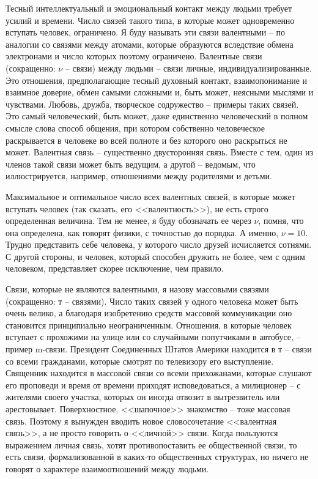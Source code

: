 \documentclass{book}
\begin{document}
Тесный интеллектуальный и эмоциональный контакт между людьми требует усилий и времени. Число связей такого типа, в которые может одновременно вступать человек, ограничено. Я буду называть эти связи валентными --  по аналогии со связями между атомами, которые образуются вследствие обмена электронами и число которых поэтому ограничено. Валентные связи (сокращенно: $\nu$ --  связи) между людьми -- связи личные, индивидуализированные. Это отношения, предполагающие тес­ный духовный контакт, взаимопонимание и взаимное доверие, обмен самыми сложными и, быть может, неясными мыслями и чувствами. Любовь, дружба, творческое содружество -- при­меры таких связей. Это самый человеческий, быть может, даже единственно человеческий в полном смысле слова способ обще­ния, при котором собственно человеческое раскрывается в чело­веке во всей полноте и без которого оно раскрыться не может. Валентная связь -- существенно двусторонняя связь. Вместе с тем, один из членов такой связи может быть ведущим, а другой -- ведомым, что 
иллюстрируется, например, отношениями между родителями и детьми.

Максимальное и оптимальное число всех валентных связей, в которые может вступать человек (так сказать, его <<валент­ность>>), не есть строго определенная величина. Тем не менее, я буду обозначать ее через $\nu$,  помня, что она определена, как го­ворят физики, с точностью до порядка. А именно, $\nu = 10$. Трудно представить себе человека, у которого число друзей исчисляется сотнями. С другой стороны, и человек, который спо­собен дружить не более, чем с одним человеком, представляет скорее исключение, чем правило.

Связи, которые не являются валентными, я назову массовы­ми связями  (сокращенно: т --  связями). Число таких связей у одного человека может быть очень велико, а благодаря изоб­ретению средств массовой коммуникации оно становится принципиально неограниченным. Отношения, в которые чело­век вступает с прохожими на улице или со случайными попут­чиками в автобусе, -- пример m-связи. Президент Соединенных Штатов Америки находится в т --  связи со всеми гражданами, которые смотрят по телевизору его выступление. Священник находится в массовой связи со всеми прихожанами, которые слушают его проповеди и время от времени приходят испове­доваться, а милиционер -- с жителями своего участка, которых он иногда отвозит в вытрезвитель или арестовывает. Поверх­ностное, <<шапочное>> знакомство -- тоже массовая связь. Поэтому я вынужден вводить новое словосочетание <<валентная связь>>, а не просто говорить о <<личной>> связи. Когда пользуют­ся выражением личная связь,  хотят противопоставить ее об­щественной связи,  то есть 
связи, 
формализованной в каких-то общественных структурах, но ничего не говорят о характере взаимоотношений между людьми.
\end{document}
